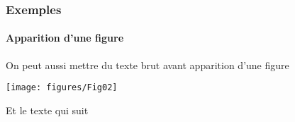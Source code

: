 \begin{frame}
\frametitle{Exemples}
\framesubtitle{Apparition d'une figure}

On peut aussi mettre du texte brut avant apparition d'une figure

 {%
\begin{center}
\texttt{[image: figures/Fig02]}
\end{center}
} %

Et le texte qui suit

\end{frame}
